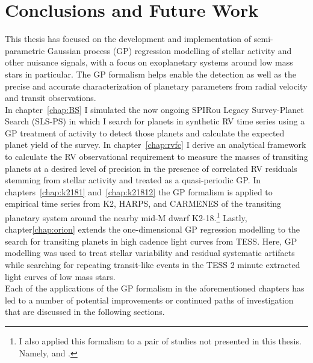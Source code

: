 \chapter{Conclusions and Future Work}

This thesis has focused on the development and implementation of
semi-parametric Gaussian process (GP) regression modelling of stellar activity
and other nuisance signals, with a focus on exoplanetary systems around low mass
stars in particular. The GP formalism helps enable the detection as
well as the precise and accurate characterization of planetary parameters
from radial velocity and transit observations. \\

In chapter~\ref{chap:BS} I simulated the
now ongoing SPIRou Legacy Survey-Planet Search (SLS-PS)
in which I search for planets
in synthetic RV time series using a GP treatment of activity to detect
those planets and calculate the expected planet yield of the survey. In
chapter~\ref{chap:rvfc} I derive an analytical framework to calculate the
RV observational requirement to measure the masses of transiting planets at
a desired level of precision in the presence of correlated RV residuals stemming
from stellar activity and treated as a quasi-periodic GP.
In chapters~\ref{chap:k2181} and~\ref{chap:k21812} the GP formalism is
applied to empirical time series from K2, HARPS, and CARMENES of the transiting
planetary system around the nearby mid-M dwarf K2-18.\footnote{I also applied this
formalism to a pair of studies not presented in this thesis. Namely, \cite{bonfils18}
and \cite{ment19}.} Lastly,
chapter\ref{chap:orion} extends the one-dimensional GP regression modelling to
the search for transiting planets in high cadence light curves from TESS. Here,
GP modelling was used to treat stellar variability and residual systematic
artifacts while searching for repeating transit-like events in the TESS 2 minute
extracted light curves of low mass stars. \\

Each of the applications of the GP formalism in the aforementioned chapters
has led to a number of potential improvements or continued paths of investigation
that are discussed in the following sections.

